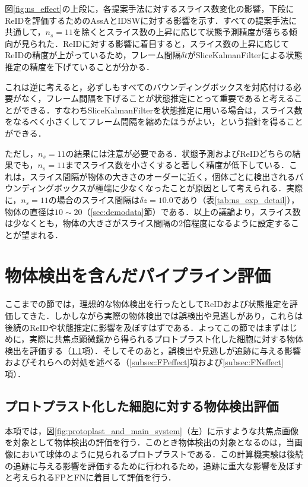     図\ref{fig:ns_effect}の上段に，各提案手法に対するスライス数変化の影響，下段にReIDを評価するためのAssAとIDSWに対する影響を示す．すべての提案手法に共通して，$n_s = 11$を除くとスライス数の上昇に応じて状態予測精度が落ちる傾向が見られた．ReIDに対する影響に着目すると，スライス数の上昇に応じてReIDの精度が上がっているため，フレーム間隔$\delta t$がSliceKalmanFilterによる状態推定の精度を下げていることが分かる．

    これは逆に考えると，必ずしもすべてのバウンディングボックスを対応付ける必要がなく，フレーム間隔を下げることが状態推定にとって重要であると考えることができる．すなわちSliceKalmanFilterを状態推定に用いる場合は，スライス数をなるべく小さくしてフレーム間隔を縮めたほうがよい，という指針を得ることができる．

    ただし，$n_s = 11$の結果には注意が必要である．状態予測およびReIDどちらの結果でも，$n_s = 11$までスライス数を小さくすると著しく精度が低下している．これは，スライス間隔が物体の大きさのオーダーに近く，個体ごとに検出されるバウンディングボックスが極端に少なくなったことが原因として考えられる．実際に，$n_s = 11$の場合のスライス間隔は$\delta z = 10.0$であり（表\ref{tab:ns_exp_detail}），物体の直径は$10 \sim 20$（\ref{sec:demodata}節）である．以上の議論より，スライス数は少なくとも，物体の大きさがスライス間隔の$2$倍程度になるように設定することが望まれる．

\section{物体検出を含んだパイプライン評価}
\label{sec:pipleline_evaluation_with_detection}

ここまでの節では，理想的な物体検出を行ったとしてReIDおよび状態推定を評価してきた．しかしながら実際の物体検出では誤検出や見逃しがあり，これらは後続のReIDや状態推定に影響を及ぼすはずである．よってこの節ではまずはじめに，実際に共焦点顕微鏡から得られるプロトプラスト化した細胞に対する物体検出を評価する（\ref{subsec:detection_of_protoplast}項）．そしてそのあと，誤検出や見逃しが追跡に与える影響およびそれらへの対処を述べる（\ref{subsec:FPeffect}項および\ref{subsec:FNeffect}項）．

    \subsection{プロトプラスト化した細胞に対する物体検出評価}
    \label{subsec:detection_of_protoplast}

    本項では，図\ref{fig:protoplast_and_main_system}（左）に示すような共焦点画像を対象として物体検出の評価を行う．このとき物体検出の対象となるのは，当画像において球体のように見られるプロトプラストである．この計算機実験は後続の追跡に与える影響を評価するために行われるため，追跡に重大な影響を及ぼすと考えられるFPとFNに着目して評価を行う．

